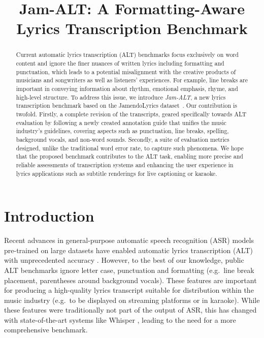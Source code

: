 \documentclass{article}
\title{Jam-ALT: A Formatting-Aware Lyrics Transcription Benchmark}
\begin{document}
\maketitle
\begin{abstract}
Current automatic lyrics transcription (ALT) benchmarks focus exclusively on word content and ignore the finer nuances of written lyrics including formatting and punctuation, which leads to a potential misalignment with the creative products of musicians and songwriters as well as listeners' experiences. For example, line breaks are important in conveying information about rhythm, emotional emphasis, rhyme, and high-level structure.
To address this issue, we introduce \emph{Jam-ALT}, a new lyrics transcription benchmark based on the JamendoLyrics dataset~\cite{durand-2023-contrastive}.
Our contribution is twofold. Firstly, a complete revision of the transcripts, geared specifically towards ALT evaluation by following a newly created annotation guide that unifies the music industry's guidelines, covering aspects such as punctuation, line breaks, spelling, background vocals, and non-word sounds. 
Secondly, a suite of evaluation metrics designed, unlike the traditional word error rate, to capture such phenomena.
We hope that the proposed benchmark contributes to the ALT task, enabling more precise and reliable assessments of transcription systems and enhancing the user experience in lyrics applications such as subtitle renderings for live captioning or karaoke.

\end{abstract}
\section{Introduction}\label{sec:introduction}
Recent advances in general-purpose automatic speech recognition (ASR) models pre-trained on large datasets \cite{baevski-2020-wav2vec2,pmlr-v202-radford23a} have enabled automatic lyrics transcription (ALT) with unprecedented accuracy \cite{ou-2022-wav2vec2-alt,zhuo-2023-lyricwhiz}.
However, to the best of our knowledge, public ALT benchmarks ignore letter case, punctuation and formatting (e.g.\ line break placement, parentheses around background vocals). These features are important for producing a high-quality lyrics transcript suitable for distribution within the music industry \cite{apple-lyrics-guidelines,lyricfind-guidelines,musixmatch-lyric-guidelines} (e.g.\ to be displayed on streaming platforms or in karaoke).
While these features were traditionally not part of the output of ASR, this has changed with state-of-the-art systems like Whisper \cite{pmlr-v202-radford23a}, leading to the need for a more comprehensive benchmark.
\end{document}
